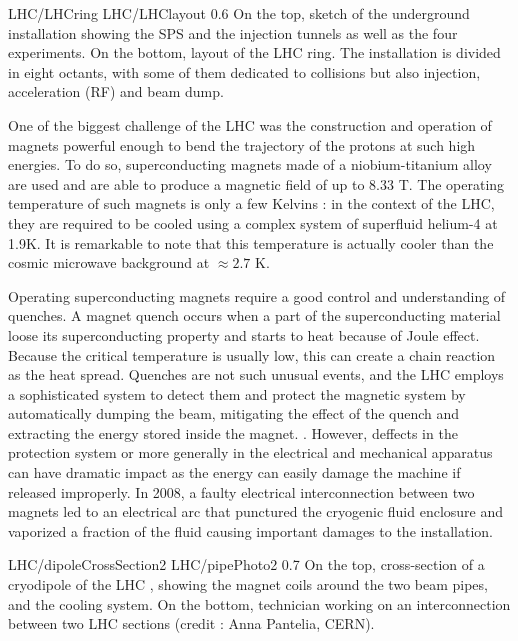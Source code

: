                      {LHC/LHCring}
                     {LHC/LHClayout}
                     {0.6}
                     {On the top, sketch of the underground installation showing the SPS
                     and the injection tunnels as well as the four experiments. On the bottom,
                     layout of the LHC ring. The installation is divided in eight octants,
                     with some of them dedicated to collisions but also injection, acceleration (RF)
                     and beam dump.}

    One of the biggest challenge of the LHC was the construction and operation of magnets
    powerful enough to bend the trajectory of the protons at such high energies. To do
    so, superconducting magnets made of a niobium-titanium alloy are used and are able to
    produce a magnetic field of up to $8.33$ T. The operating temperature of such magnets
    is only a few Kelvins : in the context of the LHC, they are required to be cooled using
    a complex system of superfluid helium-4 at 1.9K. It is remarkable to note that this
    temperature is actually cooler than the cosmic microwave background at $\approx2.7$ K.

    Operating superconducting magnets require a good control and understanding of quenches.
    A magnet quench occurs when a part of the superconducting material loose its superconducting
    property and starts to heat because of Joule effect. Because the critical temperature
    is usually low, this can create a chain reaction as the heat spread. Quenches are
    not such unusual events, and the LHC employs a sophisticated system to detect them and protect
    the magnetic system by automatically dumping the beam, mitigating the effect of the
    quench and extracting the energy stored inside the magnet.
    . However, deffects in the protection
    system or more generally in the electrical and mechanical apparatus can have dramatic
    impact as the energy can easily damage the machine if released improperly. In 2008,
    a faulty electrical interconnection between two magnets led to an electrical arc that
    punctured the cryogenic fluid enclosure and vaporized a fraction of the fluid causing
    important damages to the installation.

                     {LHC/dipoleCrossSection2}
                     {LHC/pipePhoto2}
                     {0.7}
                     {On the top, cross-section of a cryodipole of the LHC
                     ,
                     showing the magnet coils around the two beam pipes, and the cooling system.
                     On the bottom, technician working on an interconnection between two LHC
                     sections (credit : Anna Pantelia, CERN).}


